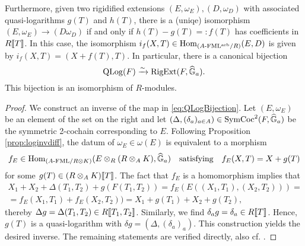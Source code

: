 \documentclass[../main.tex]{subfiles}
\begin{document}
\begin{thm}
Furthermore, given two rigidified extensions
$(E, \omega_E), (D, \omega_{D})$ with associated quasi-logarithms
$g(T)$ and $h(T)$, there is a (uniqe) isomorphism $(E, \omega_E) \to (D \omega_{D})$
if and only if $h(T)-g(T) =: f(T)$ has coefficients in $R\llbracket T \rrbracket$. 
In this case, the isomorphism $i_f(X,T) \in \operatorname{Hom}_{{({A}\text-\mathrm{FML^{arb}}/{R})}}(E, D)$ is
given by $i_f(X,T) = (X+f(T), T)$. In particular, there is a canonical bijection
\begin{equation*}
  \operatorname {QLog}(F) \xrightarrow{\sim} \operatorname {RigExt}(F, \widehat{\mathbb{G}}_a).
\end{equation*}
This bijection is an isomorphism of $R$-modules.
\begin{proof}[Proof]
  We construct an inverse of the map in \eqref{eq:QLogBijection}. Let $(E,
  \omega_E)$ be an element of the set on the right
  and let $(\Delta, (\delta_a)_{a \in A}) \in
  \operatorname{SymCoc}^2(F, \widehat{\mathbb{G}}_a)$ be the symmetric 2-cochain corresponding to $E$.
  Following Proposition \ref{prop:loginvdiff}, the datum of 
  $\omega_E \in \omega(E)$ is equivalent to a morphism 
  $$f_E \in \operatorname{Hom}_{{({A}\text-\mathrm{FML}/{R \otimes K})}}(E \otimes_R (R \otimes_A K), \widehat{\mathbb{G}}_a)
  \quad \text{satisfying} \quad f_E(X,T) = X + g(T)$$
  for some $g(T) \in (R \otimes_A K)\llbracket T \rrbracket$. The fact that 
  $f_E$ is a homomorphism implies that 
  \begin{multline*}
    X_1 + X_2 + \Delta(T_1, T_2) + g(F(T_1,T_2)) = f_E(E((X_1, T_1), (X_2, T_2))) = \\
    = f_E(X_1, T_1) + f_E(X_2, T_2)) = X_1 + g(T_1) + X_2 + g(T_2),
  \end{multline*}
  thereby $\Delta g = \Delta(T_1, T_2) \in R\llbracket T_1, T_2\rrbracket$. Similarly, 
  we find $\delta_a g = \delta_a \in R\llbracket T \rrbracket$. Hence, $g(T)$ is a
  quasi-logarithm with $\delta g = (\Delta, (\delta_a)_a)$. 
  This construction yields the desired inverse.
  The remaining statements are verified directly, also cf. \cite[Section
  8]{hopkins1994equivariant}.
\end{proof}
\end{thm}
\end{document}
